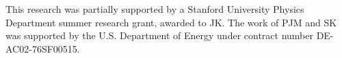 This research was partially supported by a Stanford University Physics Department summer research grant, awarded to JK. 
The work of PJM and SK was supported by the U.S. Department of Energy under contract number DE-AC02-76SF00515.
